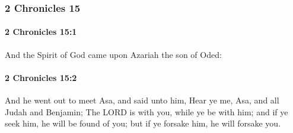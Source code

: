 	\subsubsection{2 Chronicles 15} %
		\label{2CHRONICLES-15}

		\paragraph{2 Chronicles 15:1} %
			\label{2CHRONICLES-15-1}

			And the Spirit of God came upon Azariah the son of Oded:


		\paragraph{2 Chronicles 15:2} %
			\label{2CHRONICLES-15-2}

			And he went out to meet Asa, and said unto him, Hear ye me, Asa, and all Judah and Benjamin; The LORD is with you, while ye be with him; and if ye seek him, he will be found of you; but if ye forsake him, he will forsake you.

